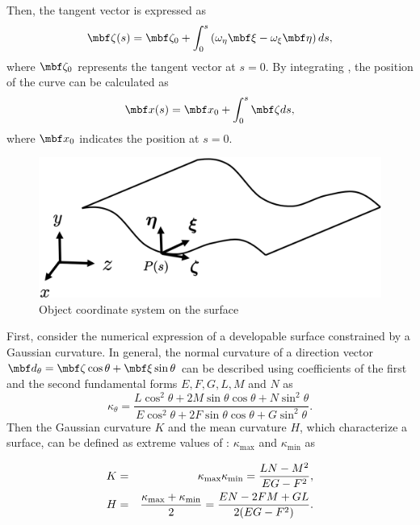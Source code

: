 \documentclass[E]{scitrans}
\begin{document}
Then, the tangent vector is expressed as 
\begin{equation}
\zetavec(s) = \zetavec_0 + \int_{0}^{s} \left( \omega_{\eta} \xivec - \omega_{\xi} \etavec \right) ds,
\label{eq:zetav_eq}
\end{equation}
where $\zetavec_0$ represents the tangent vector at $s=0$. By integrating , the position of the curve can be calculated as
\begin{equation}
\mbold{x}(s) = \mbold{x}_0 + \int_0^s \zetavec ds, 
\end{equation}
where $\mbold{x}_0$ indicates the position at $s=0$. 

\begin{figure}[thpb]
	\centering
	\includegraphics[width = 0.8\columnwidth]{./figure/Object_Coordinates.eps}
	\caption{Object coordinate system on the surface}
	\label{fig:obj_coord}
\end{figure}

First, consider the numerical expression of a developable surface constrained by a Gaussian curvature. In general, the normal curvature of a direction vector $\mbold{d}_{\theta} = \zetavec \cos \theta + \xivec \sin \theta $ can be described using coefficients of the first and the second fundamental forms $E, F, G, L, M$ and $N$ as
\begin{equation}\label{eq:def_kappa_theta}
\kappa_{\theta} = \frac{L \cos^2 \theta + 2M \sin \theta \cos \theta + N \sin^2 \theta}{E \cos^2 \theta + 2F \sin \theta \cos \theta + G \sin^2 \theta}.
\end{equation}
Then the Gaussian curvature $K$ and the mean curvature $H$, which characterize a surface, can be defined as extreme values of : $ \kappa_{\max} $ and $ \kappa_{\min} $ as

\begin{eqnarray}
K &=& \kappa_{\max}  \kappa_{\min}  = {\displaystyle{\frac{LN-M^2}{EG-F^2}}}, \nonumber \\ 
H &=& {\displaystyle{\frac{\kappa_{\max} + \kappa_{\min}}{2}}} = \frac{EN-2FM+GL}{2(EG-F^2)}. 
\end{eqnarray}
\end{document}
